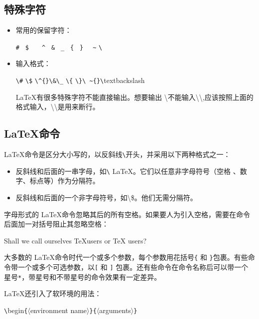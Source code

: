 \documentclass[UTF8]{ctexart}
\begin{document}
\subsection{特殊字符}
\begin{itemize}
  \item 常用的保留字符：

  \qquad \texttt{\#} \qquad \texttt{~\$} \qquad \texttt{~~~\^} \qquad \texttt{~\&} \qquad \texttt{~\_} \qquad \texttt{~\{} \qquad \texttt{~\}} \qquad \texttt{~~\~} \qquad \texttt{\textbackslash}
  \item 输入格式：

  \qquad \texttt{\textbackslash}\texttt{\#} \qquad \texttt{\textbackslash}\texttt{\$} \qquad \texttt{\textbackslash}\texttt{\^{}}\texttt{\{}\texttt{\}}\qquad\texttt{\textbackslash}\texttt{\&}\qquad \texttt{\textbackslash}\texttt{\_} \qquad \texttt{\textbackslash}\texttt{\{} \qquad \texttt{\textbackslash}\texttt{\}}\qquad\texttt{\textbackslash}\texttt{~\~}\texttt{\{}\texttt{\}}\qquad\texttt{\textbackslash}textbackslash

  \LaTeX 有很多特殊字符不能直接输出。想要输出 \textbackslash 不能输入\textbackslash\textbackslash,应该按照上面的格式输入，\textbackslash\textbackslash 是用来断行。
\end{itemize}
\subsection{\LaTeX 命令}
\LaTeX 命令是区分大小写的，以反斜线\texttt{\textbackslash}开头，并采用以下两种格式之一：
\begin{itemize}
  \item 反斜线和后面的一串字母，如\texttt{\textbackslash} LaTeX。它们以任意非字母符号（空格
、数字、标点等）作为分隔符。
  \item 反斜线和后面的一个非字母符号，如\textbackslash\$。他们无需分隔符。
\end{itemize}
 \qquad 字母形式的 \LaTeX 命令忽略其后的所有空格。如果要人为引入空格，需要在命令后面加一对括号阻止其忽略空格：

 Shall we call ourselves \TeX users or  \TeX{} users?

大多数的 \LaTeX 命令时代一个或多个参数，每个参数用花括号\texttt{\{} 和 \texttt{\}}包裹。有些命令带一个或多个可选参数，以\texttt{[} 和 \texttt{]} 包裹。还有些命令在命令名称后可以带一个星号\texttt{*}，带星号和不带星号的命令效果有一定差异。

\LaTeX 还引入了软环境的用法：

\texttt{\textbackslash}begin\texttt{\{}$\langle$environment\,\,name$\rangle$\texttt{\}}\texttt{\{}$\langle$arguments$\rangle$\texttt{\}}
\end{document}
